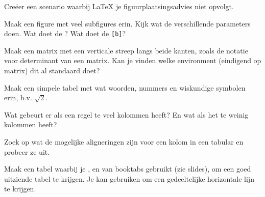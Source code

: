 \documentclass[a4paper]{article}
\begin{document}

    \begin{exercise}[Figuurplaatsing]
        Cre\"eer een scenario waarbij \LaTeX{} je figuurplaatsingsadvies niet opvolgt.
    \end{exercise}

    \begin{exercise}[Subfigure]
        Maak een figure met veel subfigures erin. Kijk wat de verschillende parameters
        doen. Wat doet de \texttt{\textwidth}? Wat doet de \texttt{[b]}?
    \end{exercise}

    \begin{exercise}[Matrix]
        Maak een matrix met een verticale streep langs beide kanten, zoals de
        notatie voor determinant van een matrix. Kan je vinden welke environment (eindigend op
        matrix) dit al standaard doet?
    \end{exercise}

    \begin{exercise}
        Maak een simpele tabel met wat woorden, nummers en wiskundige symbolen erin, b.v. $ \sqrt{2} $.
    \end{exercise}

    \begin{exercise}[Kolomscheidingen]
        Wat gebeurt er als een regel te veel kolommen heeft? En wat als het te
        weinig kolommen heeft?
    \end{exercise}

    \begin{exercise}[Alignering]
        Zoek op wat de mogelijke aligneringen zijn voor een kolom in een tabular
        en probeer ze uit.
    \end{exercise}

    \begin{exercise}[Booktabs]
        Maak een tabel waarbij je \texttt{\toprule}, \texttt{\midrule}
        en \texttt{\bottom} van booktabs gebruikt (zie slides), om
        een goed uitziende tabel te krijgen. Je kan \texttt{\cmidrule} gebruiken om een
        gedeeltelijke horizontale lijn te krijgen.
    \end{exercise}
\end{document}

